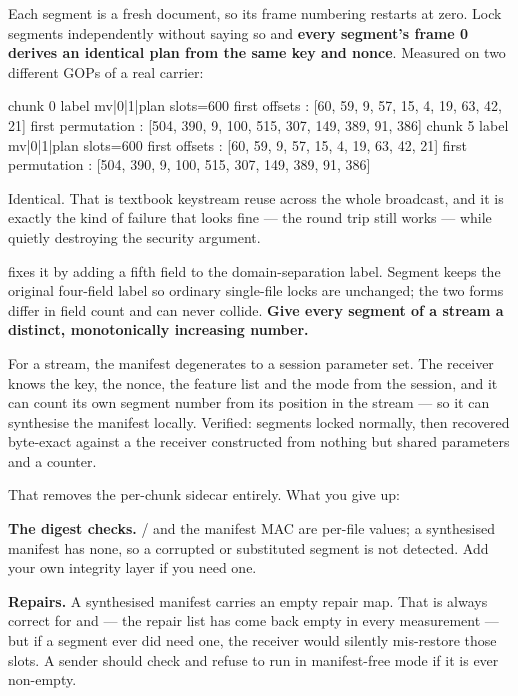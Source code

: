 \documentclass[fontpath=fonts/,logopath=logo/]{riposte-doc}
\begin{document}
Each segment is a fresh document, so its frame numbering restarts at zero. Lock segments independently without saying so and \textbf{every segment's frame 0 derives an identical plan from the same key and nonce}. Measured on two different GOPs of a real carrier:

\ripcodeopen
{}
\begin{ripcodeblock}
chunk 0   label mv|0|1|plan   slots=600
    first offsets     : [60, 59, 9, 57, 15, 4, 19, 63, 42, 21]
    first permutation : [504, 390, 9, 100, 515, 307, 149, 389, 91, 386]
chunk 5   label mv|0|1|plan   slots=600
    first offsets     : [60, 59, 9, 57, 15, 4, 19, 63, 42, 21]
    first permutation : [504, 390, 9, 100, 515, 307, 149, 389, 91, 386]
\end{ripcodeblock}
\ripcodesizereset\ripcodeclose

Identical. That is textbook keystream reuse across the whole broadcast, and it is exactly the kind of failure that looks fine — the round trip still works — while quietly destroying the security argument.

 fixes it by adding a fifth field to the domain-separation label. Segment  keeps the original four-field label so ordinary single-file locks are unchanged; the two forms differ in field count and can never collide. \textbf{Give every segment of a stream a distinct, monotonically increasing number.}



For a stream, the manifest degenerates to a session parameter set. The receiver knows the key, the nonce, the feature list and the mode from the session, and it can count its own segment number from its position in the stream — so it can synthesise the manifest locally. Verified: segments locked normally, then recovered byte-exact against a  the receiver constructed from nothing but shared parameters and a counter.

That removes the per-chunk sidecar entirely. What you give up:

\begin{ripbullets}
\item \textbf{The digest checks.}  /  and the manifest MAC are per-file values; a synthesised manifest has none, so a corrupted or substituted segment is not detected. Add your own integrity layer if you need one.
\item \textbf{Repairs.} A synthesised manifest carries an empty repair map. That is always correct for  and  — the repair list has come back empty in every measurement — but if a segment ever did need one, the receiver would silently mis-restore those slots. A sender should check  and refuse to run in manifest-free mode if it is ever non-empty.
\end{ripbullets}
\end{document}

